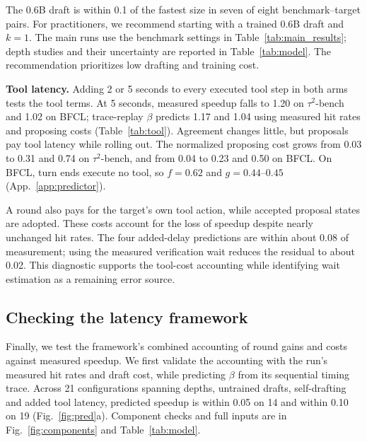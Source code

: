 The 0.6B draft is within 0.1\xx{} of the fastest size in seven of eight benchmark--target pairs.
For practitioners, we recommend starting with a trained 0.6B draft and $k{=}1$.
The main runs use the benchmark settings in Table~\ref{tab:main_results}; depth studies and their
uncertainty are reported in Table~\ref{tab:model}. The recommendation prioritizes low drafting and
training cost.

\noindent
\begin{minipage}[t]{0.56\linewidth}
\vspace{0pt}
\textbf{Tool latency.}
Adding 2 or 5 seconds to every executed tool step in both arms tests the tool terms. At 5 seconds,
measured speedup falls to 1.20\xx{} on $\tau^2$-bench and 1.02\xx{} on BFCL; trace-replay $\beta$
predicts 1.17\xx{} and 1.04\xx{} using measured hit rates and proposing costs (Table~\ref{tab:tool}).
Agreement changes little, but proposals pay tool latency while rolling out. The normalized proposing
cost grows from 0.03 to 0.31 and 0.74 on $\tau^2$-bench, and from 0.04 to 0.23 and 0.50 on BFCL.
On BFCL, turn ends execute no tool, so $f=0.62$ and $g=0.44$--$0.45$ (App.~\ref{app:predictor}).
\end{minipage}\hfill
\begin{minipage}[t]{0.41\linewidth}
\vspace{0pt}

\end{minipage}
\par\medskip
A round also pays for the target's own tool action, while accepted proposal states are adopted.
These costs account for the loss of speedup despite nearly unchanged hit rates. The four added-delay
predictions are within about 0.08\xx{} of measurement; using the measured verification wait reduces
the residual to about 0.02\xx{}. This diagnostic supports the tool-cost accounting while identifying
wait estimation as a remaining error source.

\subsection{Checking the latency framework}
\label{sec:validation}
Finally, we test the framework's combined accounting of round gains and costs against measured speedup.
We first validate the accounting with the run's measured hit rates and draft cost, while predicting
$\beta$ from its sequential timing trace. Across 21 configurations spanning depths, untrained
drafts, self-drafting and added tool latency, predicted speedup is within 0.05\xx{} on 14 and
within 0.10\xx{} on 19 (Fig.~\ref{fig:pred}a). Component checks and full inputs are in
Fig.~\ref{fig:components} and Table~\ref{tab:model}.

